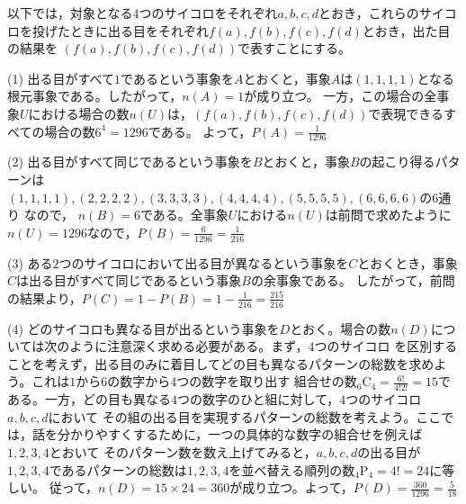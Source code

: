 \begin{解答}

以下では，対象となる$4$つのサイコロをそれぞれ$a,b,c,d$とおき，これらのサイコロを投げたときに出る目をそれぞれ$f(a),f(b),f(c),f(d)$とおき，出た目の結果を
$(f(a),f(b),f(c),f(d))$で表すことにする。

\noindent
(1) 出る目がすべて$1$であるという事象を$A$とおくと，事象$A$は$(1,1,1,1)$となる根元事象である。したがって，$n(A)=1$が成り立つ。
一方，この場合の全事象$U$における場合の数$n(U)$は，$(f(a),f(b),f(c),f(d))$で表現できるすべての場合の数$6^4=1296$である。
よって，$P(A)=\frac{1}{1296}$

\noindent
(2) 出る目がすべて同じであるという事象を$B$とおくと，事象$B$の起こり得るパターンは\\
$(1,1,1,1), (2,2,2,2), (3,3,3,3), (4,4,4,4), (5,5,5,5), (6,6,6,6)$の6通り
なので，\linebreak
$n(B)=6$である。全事象$U$における$n(U)$は前問で求めたように$n(U)=1296$なので，$P(B)=\frac{6}{1296}=\frac{1}{216}$

\noindent
(3) ある$2$つのサイコロにおいて出る目が異なるという事象を$C$とおくとき，事象$C$は出る目がすべて同じであるという事象$B$の余事象である。
したがって，前問の結果より，$P(C)=1-P(B)=1-\frac{1}{216}=\frac{215}{216}$ 

\noindent
(4) どのサイコロも異なる目が出るという事象を$D$とおく。場合の数$n(D)$については次のように注意深く求める必要がある。まず，$4$つのサイコロ
を区別することを考えず，出る目のみに着目してどの目も異なるパターンの総数を求めよう。これは$1$から$6$の数字から$4$つの数字を取り出す
組合せの数${}_6 \mathrm{C}_4=\frac{6!}{4!2!}=15$である。一方，どの目も異なる$4$つの数字のひと組に対して，$4$つのサイコロ$a,b,c,d$において
その組の出る目を実現するパターンの総数を考えよう。ここでは，話を分かりやすくするために，一つの具体的な数字の組合せを例えば$1,2,3,4$とおいて
そのパターン数を数え上げてみると，$a,b,c,d$の出る目が$1,2,3,4$であるパターンの総数は$1,2,3,4$を並べ替える順列の数${}_4 \mathrm{P}_4=4!=24$に等しい。
従って，$n(D)=15\times 24=360$が成り立つ。よって，$P(D)=\frac{360}{1296}=\frac{5}{18}$
\end{解答}
